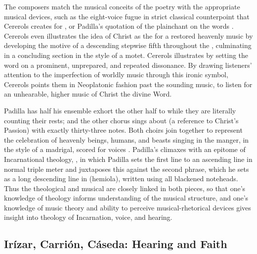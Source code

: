 The composers match the musical conceits of the poetry with the appropriate musical devices, such as the eight-voice fugue in strict classical counterpoint that Cererols creates for , or Padilla's quotation of the plainchant  on the words .
Cererols even illustrates the idea of Christ as the  for a restored heavenly music by developing the motive of a descending stepwise fifth throughout the , culminating in a concluding section in the style of a  motet.
Cererols illustrates  by setting the word  on a prominent, unprepared, and repeated dissonance.
By drawing listeners' attention to the imperfection of worldly music through this ironic symbol, Cererols points them in Neoplatonic fashion past the sounding music, to listen for an unhearable, higher music of Christ the divine Word.

Padilla has half his ensemble exhort the other half to  while they are literally counting their rests; and the other chorus sings about  (a reference to Christ's Passion) with exactly thirty-three notes.
Both choirs join together to represent the celebration of heavenly beings, humans, and beasts singing in the manger, in the style of a madrigal, scored for voices .
Padilla's  climaxes with an epitome of Incarnational theology, , in which Padilla sets the first line to an ascending line in normal triple meter and juxtaposes this against the second phrase, which he sets as a long descending line in  (hemiola), written using all blackened noteheads.
Thus the theological and musical are closely linked in both pieces, so that one's knowledge of theology informs understanding of the musical structure, and one's knowledge of music theory and ability to perceive musical-rhetorical devices gives insight into theology of Incarnation, voice, and hearing.

\subsection{Irízar, Carrión, Cáseda: Hearing and Faith}

